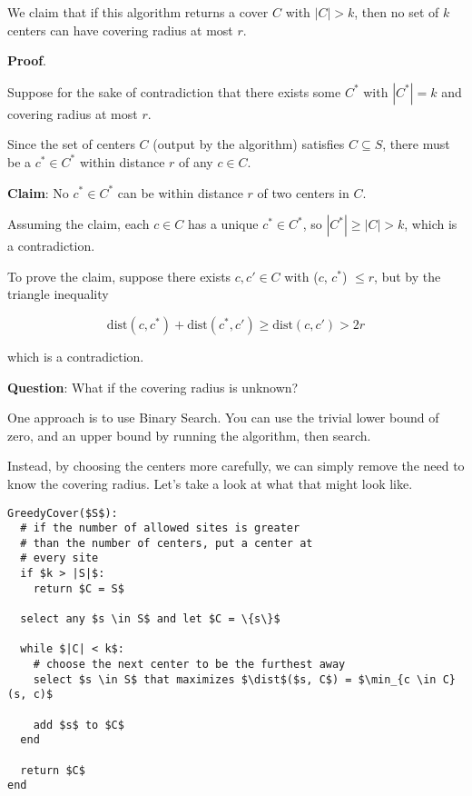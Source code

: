 \documentclass[12pt]{article}
\def\dist{\text{dist}}
\begin{document}
  We claim that if this algorithm returns a cover $C$ with $|C| > k$, then no
  set of $k$ centers can have covering radius at most $r$.

  {\bf Proof}.

  Suppose for the sake of contradiction that there exists some $C^*$ with $|C^*|
  = k$ and covering radius at most $r$.

  Since the set of centers $C$ (output by the algorithm) satisfies $C \subseteq
  S$, there must be a $c^* \in C^*$ within distance $r$ of any $c \in C$.

  {\bf Claim}: No $c^* \in C^*$ can be within distance $r$ of two centers in
  $C$.

  Assuming the claim, each $c \in C$ has a unique $c^* \in C^*$, so $|C^*| \ge
  |C| > k$, which is a contradiction.

  To prove the claim, suppose there exists $c, c' \in C$ with \dist($c$,
  $c^*$) $\le r$, but by the triangle inequality 

  \[
    \dist(c, c^*) + \dist(c^*, c') \ge \dist(c, c') > 2r
  \]

  which is a contradiction.


  {\bf Question}: What if the covering radius is unknown?

  One approach is to use Binary Search. You can use the trivial lower bound of
  zero, and an upper bound by running the algorithm, then search.

  Instead, by choosing the centers more carefully, we can simply remove the need
  to know the covering radius. Let's take a look at what that might look like.

  \begin{lstlisting}[]
GreedyCover($S$):
  # if the number of allowed sites is greater
  # than the number of centers, put a center at
  # every site
  if $k > |S|$:
    return $C = S$

  select any $s \in S$ and let $C = \{s\}$

  while $|C| < k$:
    # choose the next center to be the furthest away
    select $s \in S$ that maximizes $\dist$($s, C$) = $\min_{c \in C}(s, c)$

    add $s$ to $C$
  end

  return $C$
end
  \end{lstlisting}
\end{document}
